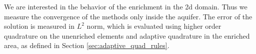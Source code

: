 %       


We are interested in the behavior of the enrichment in the 2d domain.
Thus we measure the convergence of the methods only inside the aquifer.
The error of the solution is measured in $L^2$ norm, which is evaluated using higher order quadrature
on the unenriched elements and adaptive quadrature in the enriched area, as defined in Section \ref{sec:adaptive_quad_rules}.

